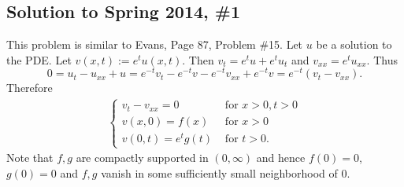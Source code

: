\subsection*{Solution to Spring 2014, \#1}\label{s141}
This problem is similar to Evans, Page 87, Problem \#15.
Let $u$ be a solution to the PDE. Let $v(x, t) := e^{t}u(x, t)$. Then
$v_{t} = e^{t}u + e^{t}u_{t}$ and $v_{xx} = e^{t}u_{xx}$. Thus
$$0 = u_{t} - u_{xx} + u = e^{-t}v_{t} - e^{-t}v - e^{-t}v_{xx} + e^{-t}v = e^{-t}(v_{t} - v_{xx}).$$
Therefore
\begin{align*}
\begin{cases}
v_{t} - v_{xx}  = 0 & \text{ for } x > 0, t > 0\\
v(x, 0) = f(x) &\text{ for } x > 0\\
v(0, t) = e^{t}g(t) & \text{ for } t > 0.
\end{cases}
\end{align*}
Note that $f, g$ are compactly supported in $(0, \infty)$ and hence $f(0) = 0$, $g(0) = 0$ and $f, g$ vanish in some sufficiently
small neighborhood of $0$.

